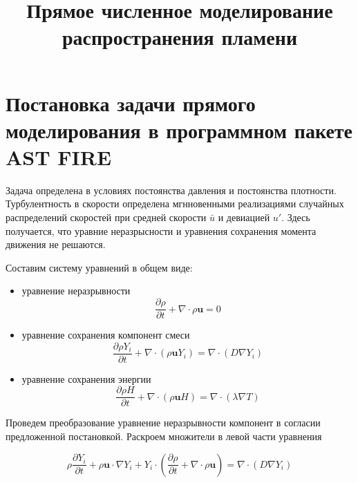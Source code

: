 \documentclass[12pt,a4paper]{article}
\title{Прямое численное моделирование распространения пламени}
\begin{document}
\maketitle

\section{Постановка задачи прямого моделирования в программном пакете AST FIRE}
 
 Задача определена в условиях постоянства давления и постоянства плотности. Турбулентность в скорости определена мгнновенными реализациями случайных распределений скоростей при средней скорости $\bar{u}$ и девиацией $u'$. Здесь получается, что уравние неразрысности и уравнения сохранения момента движения не решаются.
 
 Составим систему уравнений в общем виде:
\begin{itemize}
     \item уравнение неразрывности
        \begin{equation}\label{eq_01}
        \frac{\partial \rho }{\partial t} + 
        \nabla\cdot \rho \boldsymbol{u} = 0
        \end{equation}
    
    \item уравнение сохранения компонент смеси
         \begin{equation}\label{eq_02}
        \frac{\partial \rho Y_i}{\partial t} + 
        \nabla\cdot \left(\rho \boldsymbol{u} Y_i \right) = 
        \nabla \cdot \left( D \nabla Y_i \right)
        \end{equation}

    \item уравнение сохранения энергии
         \begin{equation}\label{eq_03}
        \frac{\partial \rho H}{\partial t} + 
        \nabla\cdot \left(\rho \boldsymbol{u} H \right) = 
        \nabla \cdot \left( \lambda \nabla T \right)
        \end{equation}
 \end{itemize}
 
 
 Проведем преобразование уравнение неразрывности компонент в согласии предложенной постановкой. Раскроем множители в левой части уравнения 

 \begin{equation}\label{eq_04}
\rho \frac{\partial Y_i}{\partial t} + 
\rho \boldsymbol{u}\cdot \nabla Y_i + 
 Y_i \cdot \left( \frac{\partial \rho}{\partial t} + \nabla\cdot \rho \boldsymbol{u} \right) = 
 	\nabla \cdot \left( D \nabla Y_i \right)
\end{equation}
\end{document}
